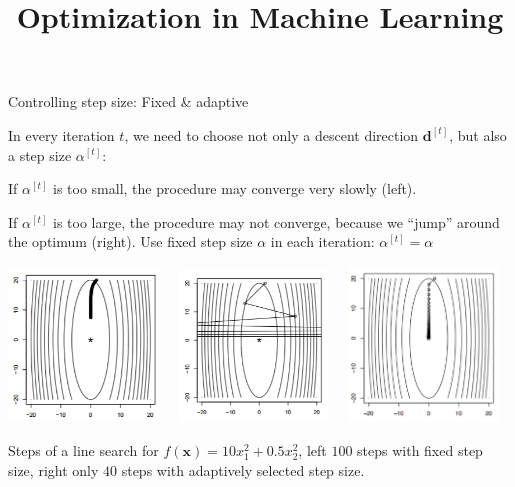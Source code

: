 \documentclass[11pt,compress,t,notes=noshow, xcolor=table]{beamer}
\title{Optimization in Machine Learning}
\date{}
\begin{document}
\sloppy

	

	\begin{vbframe}{Controlling step size: Fixed \& adaptive}
		
		In every iteration $t$, we need to choose not only a descent direction $\mathbf{d}^{[t]}$, but also a step size $\alpha^{[t]}$:
		\begin{itemize}
		\end{itemize}

		
		\begin{center}
			\includegraphics[width = 0.3\textwidth]{figure_man/stepsize_small.png}~~
			\includegraphics[width = 0.3\textwidth]{figure_man/stepsize_large.png}~~
			\includegraphics[width = 0.3\textwidth]{figure_man/stepsize_adaptive.png}
			\begin{footnotesize}
				Steps of a line search for $f(\bm{x}) = 10 x_1^2 + 0.5 x_2^2$, left $100$ steps with fixed step size, right only $40$ steps with adaptively selected step size.
			\end{footnotesize}
		\end{center} 		
		
	\end{vbframe}
	
\end{document}
